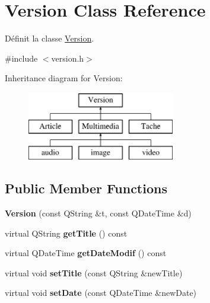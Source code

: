 \hypertarget{class_version}{}\section{Version Class Reference}
\label{class_version}


Définit la classe \hyperlink{class_version}{Version}.  




{\ttfamily \#include $<$version.\+h$>$}

Inheritance diagram for Version\+:\begin{figure}[H]
\begin{center}
\leavevmode
\includegraphics[height=3.000000cm]{class_version}
\end{center}
\end{figure}
\subsection*{Public Member Functions}
\begin{DoxyCompactItemize}
\item 
\mbox{\label{class_version_ab48e595b9f0ed6ef7048048eb0dd537d}} 
{\bfseries Version} (const Q\+String \&t, const Q\+Date\+Time \&d)
\item 
\mbox{\label{class_version_a54015f35fb47dea6e46e47ad9f8555ae}} 
virtual Q\+String {\bfseries get\+Title} () const
\item 
\mbox{\label{class_version_a757be3ac49f4a28f91bebb14d00cfe9a}} 
virtual Q\+Date\+Time {\bfseries get\+Date\+Modif} () const
\item 
\mbox{\label{class_version_ae85b36ab74d00d8dc8fa88ef5ccb3c20}} 
virtual void {\bfseries set\+Title} (const Q\+String \&new\+Title)
\item 
\mbox{\label{class_version_a925ae5cb79c371a278e7bfd5a3b094a2}} 
virtual void {\bfseries set\+Date} (const Q\+Date\+Time \&new\+Date)
\end{DoxyCompactItemize}


